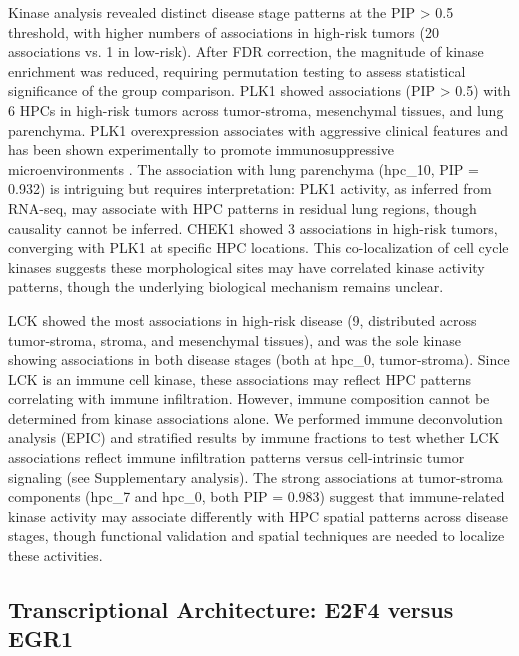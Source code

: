 \documentclass[pdflatex,article,12pt]{article}
\begin{document}
Kinase analysis revealed distinct disease stage patterns at the PIP > 0.5 threshold, with higher numbers of associations in high-risk tumors (20 associations vs. 1 in low-risk). After FDR correction, the magnitude of kinase enrichment was reduced, requiring permutation testing to assess statistical significance of the group comparison. PLK1 showed associations (PIP > 0.5) with 6 HPCs in high-risk tumors across tumor-stroma, mesenchymal tissues, and lung parenchyma. PLK1 overexpression associates with aggressive clinical features and has been shown experimentally to promote immunosuppressive microenvironments \cite{feng2017plk1,zhao2020plk1,zhang2023polo,wang2024plk1}. The association with lung parenchyma (hpc\_10, PIP = 0.932) is intriguing but requires interpretation: PLK1 activity, as inferred from RNA-seq, may associate with HPC patterns in residual lung regions, though causality cannot be inferred. CHEK1 showed 3 associations in high-risk tumors, converging with PLK1 at specific HPC locations. This co-localization of cell cycle kinases suggests these morphological sites may have correlated kinase activity patterns, though the underlying biological mechanism remains unclear.

LCK showed the most associations in high-risk disease (9, distributed across tumor-stroma, stroma, and mesenchymal tissues), and was the sole kinase showing associations in both disease stages (both at hpc\_0, tumor-stroma). Since LCK is an immune cell kinase, these associations may reflect HPC patterns correlating with immune infiltration. However, immune composition cannot be determined from kinase associations alone. We performed immune deconvolution analysis (EPIC) and stratified results by immune fractions to test whether LCK associations reflect immune infiltration patterns versus cell-intrinsic tumor signaling (see Supplementary analysis). The strong associations at tumor-stroma components (hpc\_7 and hpc\_0, both PIP = 0.983) suggest that immune-related kinase activity may associate differently with HPC spatial patterns across disease stages, though functional validation and spatial techniques are needed to localize these activities.

\subsection{Transcriptional Architecture: E2F4 versus EGR1}
\end{document}
